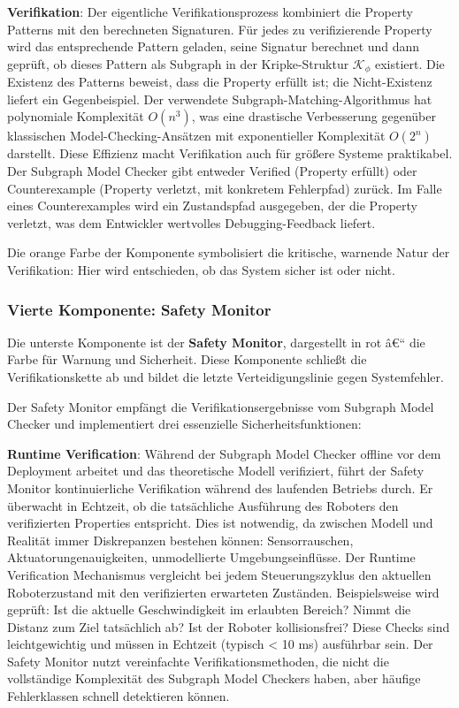 ﻿\documentclass[a4paper,12pt]{article}
\theoremstyle{definition}
\begin{document}
\textbf{Verifikation}: Der eigentliche Verifikationsprozess kombiniert die Property Patterns mit den berechneten Signaturen. Für jedes zu verifizierende Property wird das entsprechende Pattern geladen, seine Signatur berechnet und dann geprüft, ob dieses Pattern als Subgraph in der Kripke-Struktur $\mathcal{K}_\phi$ existiert. Die Existenz des Patterns beweist, dass die Property erfüllt ist; die Nicht-Existenz liefert ein Gegenbeispiel. Der verwendete Subgraph-Matching-Algorithmus hat polynomiale Komplexität $O(n^3)$, was eine drastische Verbesserung gegenüber klassischen Model-Checking-Ansätzen mit exponentieller Komplexität $O(2^n)$ darstellt. Diese Effizienz macht Verifikation auch für größere Systeme praktikabel. Der Subgraph Model Checker gibt entweder Verified (Property erfüllt) oder Counterexample (Property verletzt, mit konkretem Fehlerpfad) zurück. Im Falle eines Counterexamples wird ein Zustandspfad ausgegeben, der die Property verletzt, was dem Entwickler wertvolles Debugging-Feedback liefert.

Die orange Farbe der Komponente symbolisiert die kritische, warnende Natur der Verifikation: Hier wird entschieden, ob das System sicher ist oder nicht.

\subsubsection{Vierte Komponente: Safety Monitor}

Die unterste Komponente ist der \textbf{Safety Monitor}, dargestellt in rot â€“ die Farbe für Warnung und Sicherheit. Diese Komponente schließt die Verifikationskette ab und bildet die letzte Verteidigungslinie gegen Systemfehler.

Der Safety Monitor empfängt die Verifikationsergebnisse vom Subgraph Model Checker und implementiert drei essenzielle Sicherheitsfunktionen:

\textbf{Runtime Verification}: Während der Subgraph Model Checker offline vor dem Deployment arbeitet und das theoretische Modell verifiziert, führt der Safety Monitor kontinuierliche Verifikation während des laufenden Betriebs durch. Er überwacht in Echtzeit, ob die tatsächliche Ausführung des Roboters den verifizierten Properties entspricht. Dies ist notwendig, da zwischen Modell und Realität immer Diskrepanzen bestehen können: Sensorrauschen, Aktuatorungenauigkeiten, unmodellierte Umgebungseinflüsse. Der Runtime Verification Mechanismus vergleicht bei jedem Steuerungszyklus den aktuellen Roboterzustand mit den verifizierten erwarteten Zuständen. Beispielsweise wird geprüft: Ist die aktuelle Geschwindigkeit im erlaubten Bereich? Nimmt die Distanz zum Ziel tatsächlich ab? Ist der Roboter kollisionsfrei? Diese Checks sind leichtgewichtig und müssen in Echtzeit (typisch < 10 ms) ausführbar sein. Der Safety Monitor nutzt vereinfachte Verifikationsmethoden, die nicht die vollständige Komplexität des Subgraph Model Checkers haben, aber häufige Fehlerklassen schnell detektieren können.
\end{document}
